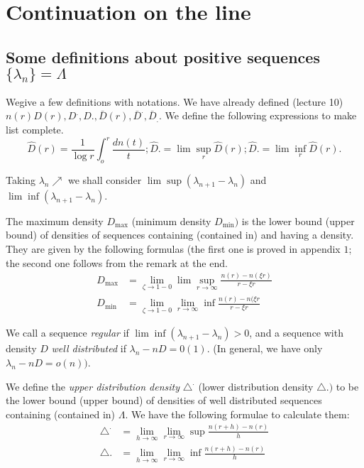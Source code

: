 \chapter{Continuation on the line}\label{chap17}

\section{Some definitions about positive sequences \texorpdfstring{$\big \{ \lambda_n
 \big\} = \Lambda$}{Lambda}}\label{chap17:sec1}%

We\pageoriginale give a few definitions with notations. We have already defined
(lecture 10) $n (r) D (r), D^., D., \bar{D}(r), \bar{D}^., \bar{D}_.$. We
define the following expressions to make list complete. 
$$
\hat{D}(r) = \frac{1}{\log r} \int^r_o \frac{dn (t)}{t} ; \hat{D}. =
\lim\sup_{r} \hat{D}(r) ; \hat{D}. = \lim\inf_{r} \hat{D}(r). 
$$

Taking $\lambda_n \nearrow$ we shall consider $\lim \sup (\lambda_{n +
 1} - \lambda_n)$ and $\lim \inf (\lambda_{n + 1} - \lambda_n)$. 

The maximum density $D_{\max}$ (minimum density $D_{\min})$ is the
lower bound (upper bound) of densities of sequences containing
(contained in) and having a density. They are given by the following
formulas (the first one is proved in appendix $1$; the second one
follows from the remark at the end. 
\begin{align*}
 D_{\max} & = \lim_{\zeta \to 1-0} \lim\sup_{r \to \infty} \frac{n(r)
 - n(\xi r)}{r - \xi r}\\ 
 D_{\min} & = \lim_{\zeta \to 1-0} \lim_{r \to \infty} \inf \frac{n
 (r) - n (\xi r}{r - \xi r} 
\end{align*}

We call a sequence \textit{regular} if $\lim \inf (\lambda_{n+1} -
\lambda_n) > 0$, and a sequence with density $D$ \textit{well
 distributed} if $\lambda_n - nD = 0(1)$. (In general, we have only
$\lambda_n - n D = o (n))$. 

We define the \textit{upper distribution density} $\triangle^.$ (lower
distribution density $\triangle.)$ to be the lower bound (upper bound)
of densities of well distributed sequences containing (contained in)
$\Lambda$. We have the following formulae to calculate them: 
\begin{align*}
 \triangle^. & = \lim_{h \to \infty} \lim_{r \to \infty} \sup \frac{n(r+h)- n(r)}{h}\\
 \triangle. & = \lim_{h \to \infty} \lim_{r \to \infty} \inf \frac{n(r+h) - n(r)}{h}
\end{align*}


